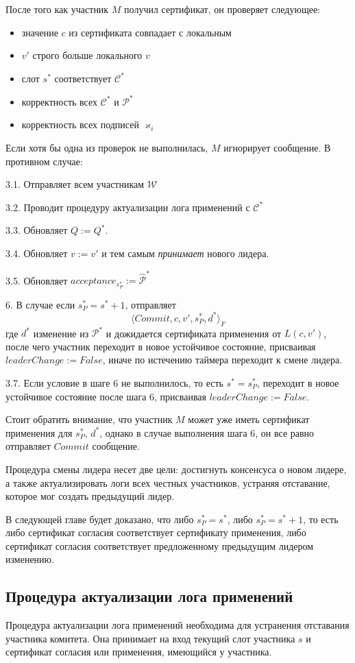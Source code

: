 После того как участник $M$ получил сертификат, он проверяет следующее:
\begin{itemize}
\item значение $c$ из сертификата совпадает с локальным
\item $v'$ строго больше локального $v$
\item слот $s^{*}$ соответствует $\mathcal{C}^{*}$
\item корректность всех $\mathcal{C}^{*}$ и $\mathcal{P}^{*}$
\item корректность всех подписей $\varkappa_i$
\end{itemize}
Если хотя бы одна из проверок не выполнилась, $M$ игнорирует сообщение. В противном случае:

3.1. Отправляет всем участникам $\mathcal{W}$

3.2. Проводит процедуру актуализации лога применений с $\mathcal{C}^{*}$

3.3. Обновляет $Q := Q^{*}$.

3.4. Обновляет $v := v'$ и тем самым \textit{принимает} нового лидера.

3.5. Обновляет $acceptance_{s_P^{*}} := \hat{\mathcal{P}}^{*}$

6. В случае если $s_P^{*}=s^{*}+1$, отправляет
\[ \langle Commit, c, v', s_P^{*}, d^{*} \rangle_F \]
где $d^{*}$ изменение из $\mathcal{P}^{*}$ и дожидается сертификата применения от $L(c, v')$, после чего участник переходит в новое устойчивое состояние, присваивая $leaderChange := False$, иначе по истечению таймера переходит к смене лидера.

3.7. Если условие в шаге 6 не выполнилось, то есть $s^{*}=s_P^{*}$, переходит в новое устойчивое состояние после шага 6, присваивая $leaderChange := False$.

Стоит обратить внимание, что участник $M$ может уже иметь сертификат применения для $s_P^{*}$, $d^{*}$, однако в случае выполнения  шага 6, он все равно отправляет $Commit$ сообщение.

Процедура смены лидера несет две цели: достигнуть консенсуса о новом лидере, а также актуализировать логи всех честных участников, устраняя отставание, которое мог создать предыдущий лидер.

В следующей главе будет доказано, что либо $s_P^{*}=s^{*}$, либо $s_P^{*}=s^{*}+1$, то есть либо сертификат согласия соответствует сертификату применения, либо сертификат согласия соответствует предложенному предыдущим лидером изменению.

\subsection{Процедура актуализации лога применений} \label{act_log}
Процедура актуализации лога применений необходима для устранения отставания участника комитета.
Она принимает на вход текущий слот участника $s$ и сертификат согласия или применения, имеющийся у участника.


